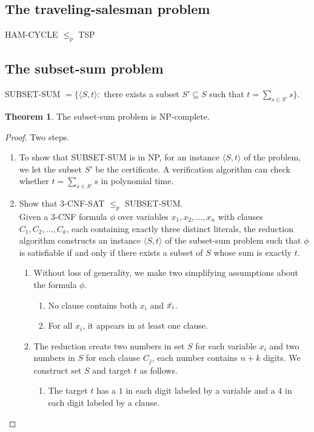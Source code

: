 \documentclass[letter]{book}
\theoremstyle{definition}
\newtheorem{theorem}{Theorem}[chapter]
\theoremstyle{definition}
\theoremstyle{remark}
\begin{document}
\subsection{The traveling-salesman problem}
HAM-CYCLE $\leq_p$ TSP
\subsection{The subset-sum problem}
SUBSET-SUM $=\{\langle S,t\rangle:$ there exists a subset $S'\subseteq S$ such that $t=\sum_{s\in S'}{s}\}$.
\setcounter{theorem}{14}
\begin{theorem}
    The subset-sum problem is NP-complete.
\end{theorem}
\begin{proof} Two steps.\\
    \begin{enumerate}
        \item To show that SUBSET-SUM is in NP, for an instance $\langle S,t\rangle$ of the problem, we let the subset $S'$ be the certificate. A verification algorithm can check whether $t=\sum_{s\in S'}{s}$ in polynomial time.
        \item Show that $3$-CNF-SAT $\leq_p$ SUBSET-SUM.\\
            Given a $3$-CNF formula $\phi$ over variables $x_1,x_2,\ldots,x_n$ with clauses $C_1,C_2,\ldots, C_k$, each containing exactly three distinct literals, the reduction algorithm constructs an instance $\langle S,t\rangle$ of the subset-sum problem such that $\phi$ is satisfiable if and only if there exists a subset of $S$ whose sum is exactly $t$.
            \begin{enumerate}
                \item Without loss of generality, we make two simplifying assumptions about the formula $\phi$.
                    \begin{enumerate}
                        \item No clause contains both $x_i$ and $\Bar{x_i}$.
                        \item For all $x_i$, it appears in at least one clause.
                    \end{enumerate}
                \item The reduction create two numbers in set $S$ for each variable $x_i$ and two numbers in $S$ for each clause $C_j$, each number contains $n+k$ digits. We construct set $S$ and target $t$ as follows.
                    \begin{enumerate}
                        \item The target $t$ has a $1$ in each digit labeled by a variable and a $4$ in each digit labeled by a clause.

\end{enumerate}
\end{enumerate}
\end{enumerate}
\end{proof}
\end{document}
